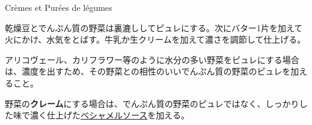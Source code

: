 \begin{main}
\begin{frsecbenv}

Crèmes et Purées de légumes

\end{frsecbenv}

乾燥豆とでんぷん質の野菜は裏漉ししてピュレにする。次にバター1片を加えて火にかけ、水気をとばす。牛乳か生クリームを加えて濃さを調節して仕上げる。

アリコヴェール、カリフラワー等のように水分の多い野菜をピュレにする場合は、濃度を出すため、その野菜との相性のいいでんぷん質の野菜のピュレを加えること。

野菜の\textbf{クレーム}にする場合は、でんぷん質の野菜のピュレではなく、しっかりした味で濃く仕上げた\protect\hyperlink{sauce-bechamel}{ベシャメルソース}を加える。

\end{main}
